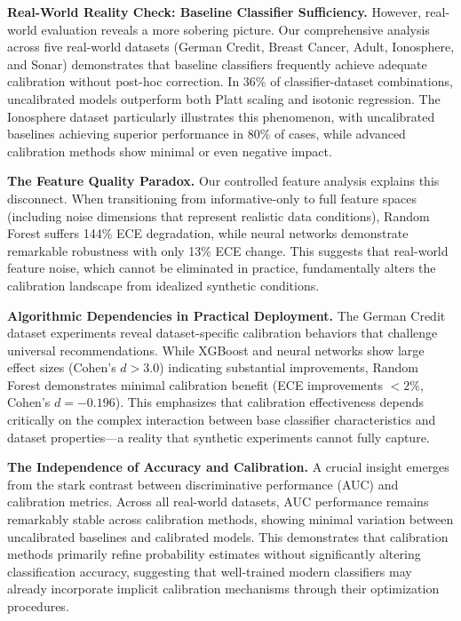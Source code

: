 \documentclass[12pt, a4paper]{article}
\begin{document}
\textbf{Real-World Reality Check: Baseline Classifier Sufficiency.} However, real-world evaluation reveals a more sobering picture. Our comprehensive analysis across five real-world datasets (German Credit, Breast Cancer, Adult, Ionosphere, and Sonar) demonstrates that baseline classifiers frequently achieve adequate calibration without post-hoc correction. In 36\% of classifier-dataset combinations, uncalibrated models outperform both Platt scaling and isotonic regression. The Ionosphere dataset particularly illustrates this phenomenon, with uncalibrated baselines achieving superior performance in 80\% of cases, while advanced calibration methods show minimal or even negative impact.

\textbf{The Feature Quality Paradox.} Our controlled feature analysis explains this disconnect. When transitioning from informative-only to full feature spaces (including noise dimensions that represent realistic data conditions), Random Forest suffers 144\% ECE degradation, while neural networks demonstrate remarkable robustness with only 13\% ECE change. This suggests that real-world feature noise, which cannot be eliminated in practice, fundamentally alters the calibration landscape from idealized synthetic conditions.

\textbf{Algorithmic Dependencies in Practical Deployment.} The German Credit dataset experiments reveal dataset-specific calibration behaviors that challenge universal recommendations. While XGBoost and neural networks show large effect sizes (Cohen's $d > 3.0$) indicating substantial improvements, Random Forest demonstrates minimal calibration benefit (ECE improvements $< 2\%$, Cohen's $d = -0.196$). This emphasizes that calibration effectiveness depends critically on the complex interaction between base classifier characteristics and dataset properties—a reality that synthetic experiments cannot fully capture.

\textbf{The Independence of Accuracy and Calibration.} A crucial insight emerges from the stark contrast between discriminative performance (AUC) and calibration metrics. Across all real-world datasets, AUC performance remains remarkably stable across calibration methods, showing minimal variation between uncalibrated baselines and calibrated models. This demonstrates that calibration methods primarily refine probability estimates without significantly altering classification accuracy, suggesting that well-trained modern classifiers may already incorporate implicit calibration mechanisms through their optimization procedures.
\end{document}
